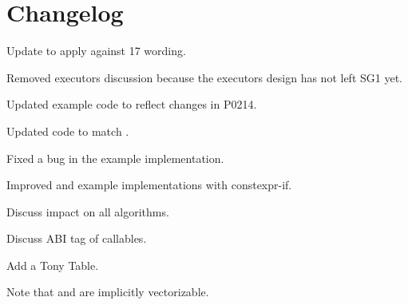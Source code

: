 \section{Changelog}
\begin{revision}
  \item Update to apply against \CC{}17 wording.
  \item Removed executors discussion because the executors design has not left SG1 yet.
  \item Updated example code to reflect changes in P0214.
\end{revision}

\begin{revision}
  \item Updated code to match \cite{N4744}.
  \item Fixed a bug in the  example implementation.
  \item Improved  and  example implementations with constexpr-if.
  \item Discuss impact on all algorithms.
\end{revision}

\begin{revision}
  \item Discuss ABI tag of  callables.
  \item Add a Tony Table.
  \item Note that  and  are implicitly vectorizable.
\end{revision}

